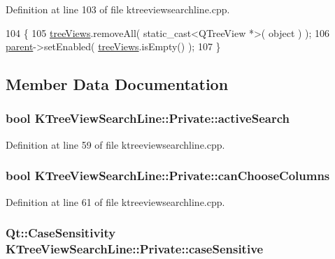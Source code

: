 Definition at line 103 of file ktreeviewsearchline.\+cpp.


\begin{DoxyCode}
104 \{
105   \hyperlink{classKTreeViewSearchLine_1_1Private_a1cc9fa46d2d3b371f075b8beea071555}{treeViews}.removeAll( static\_cast<QTreeView *>( \textcolor{keywordtype}{object} ) );
106   \hyperlink{classKTreeViewSearchLine_1_1Private_a423d46500ac68a1bd6b552ef18d1ef5a}{parent}->setEnabled( \hyperlink{classKTreeViewSearchLine_1_1Private_a1cc9fa46d2d3b371f075b8beea071555}{treeViews}.isEmpty() );
107 \}
\end{DoxyCode}


\subsection{Member Data Documentation}
\hypertarget{classKTreeViewSearchLine_1_1Private_ad57ae3ad4ebe425fbc7cb83021246e01}{
\subsubsection[{active\+Search}]{\setlength{\rightskip}{0pt plus 5cm}bool K\+Tree\+View\+Search\+Line\+::\+Private\+::active\+Search}}\label{classKTreeViewSearchLine_1_1Private_ad57ae3ad4ebe425fbc7cb83021246e01}


Definition at line 59 of file ktreeviewsearchline.\+cpp.

\hypertarget{classKTreeViewSearchLine_1_1Private_a4b7cae206d347905d89dff317c22a87c}{
\subsubsection[{can\+Choose\+Columns}]{\setlength{\rightskip}{0pt plus 5cm}bool K\+Tree\+View\+Search\+Line\+::\+Private\+::can\+Choose\+Columns}}\label{classKTreeViewSearchLine_1_1Private_a4b7cae206d347905d89dff317c22a87c}


Definition at line 61 of file ktreeviewsearchline.\+cpp.

\hypertarget{classKTreeViewSearchLine_1_1Private_ac529094933f7a304381f4f51831138d7}{
\subsubsection[{case\+Sensitive}]{\setlength{\rightskip}{0pt plus 5cm}Qt\+::\+Case\+Sensitivity K\+Tree\+View\+Search\+Line\+::\+Private\+::case\+Sensitive}}\label{classKTreeViewSearchLine_1_1Private_ac529094933f7a304381f4f51831138d7}


